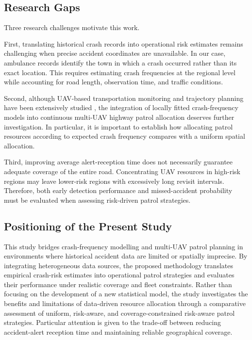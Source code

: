 \documentclass[11pt]{article}
\begin{document}
\subsection{Research Gaps}

Three research challenges motivate this work.

First, translating historical crash records into operational risk estimates remains challenging when precise accident coordinates are unavailable. In our case, ambulance records identify the town in which a crash occurred rather than its exact location.
This requires estimating crash frequencies at the regional level while accounting for road length, observation time, and traffic conditions.

Second, although UAV-based transportation monitoring and trajectory planning have been extensively studied \cite{outay2020,menouar2017,aziz2026}, the integration
of locally fitted crash-frequency models into continuous multi-UAV highway patrol allocation deserves further investigation. In particular, it is important to
establish how allocating patrol resources according to expected crash frequency compares with a uniform spatial allocation.

Third, improving average alert-reception time does not necessarily guarantee adequate coverage of the entire road. Concentrating UAV resources in high-risk regions
may leave lower-risk regions with excessively long revisit intervals. Therefore, both early detection performance and missed-accident probability must be evaluated when assessing risk-driven patrol strategies.


\subsection{Positioning of the Present Study}

This study bridges crash-frequency modelling and multi-UAV patrol planning in environments where historical accident data are limited or spatially imprecise. By integrating heterogeneous data sources, the proposed methodology translates empirical crash-risk estimates into operational patrol strategies and evaluates their performance under realistic coverage and fleet constraints. Rather than focusing on the development of a new statistical model, the study investigates the benefits and limitations of data-driven resource allocation through a comparative assessment of uniform, risk-aware, and coverage-constrained risk-aware patrol strategies. Particular attention is given to the trade-off between reducing accident-alert reception time and maintaining reliable geographical coverage.
\end{document}
